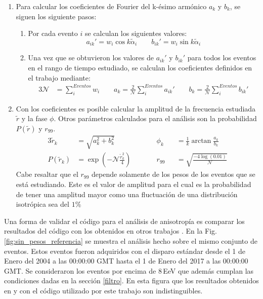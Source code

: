 \begin{enumerate}
        \item Para calcular los coeficientes de Fourier del k-ésimo armónico $a_k$ y $b_k$, se siguen los siguiente pasos:
        \begin{enumerate}
          \item Por cada evento  $i$ se calculan los siguientes valores:
          \begin{equation}
             a_{ik}' = {w_i}\cos k\tilde{\alpha}_i \qquad
             b_{ik}' = {w_i}\sin k\tilde{\alpha}_i
         \end{equation}
         \item Una vez que se obtuvieron los valores de $a_{ik}'$ y $b_{ik}'$ para todos los eventos en el rango de tiempo estudiado, se calculan los coeficientes definidos en el trabajo \cite{analisis_fourier} mediante:
         \begin{alignat}{3}
          \mathcal{N} &= \sum^{Eventos}_i w_i \qquad
            a_k = \frac{2}{\mathcal{N}} \sum^{Eventos}_i a_{ik}' \qquad
            b_k = \frac{2}{\mathcal{N}} \sum^{Eventos}_i b_{ik}'  
         \end{alignat}
        \end{enumerate}
        \item Con los coeficientes es posible calcular la amplitud de la frecuencia estudiada $\tilde{r}$ y la fase $\phi$. Otros parámetros calculados para el análisis son la probabilidad $P(\tilde{r})$  y $r_{99}$. 
        \begin{alignat}{3}
            \tilde{r}_k &= \sqrt{a_k^2 +b_k^2}                       \qquad &&   \phi_k&&= \frac{1}{k}\arctan\frac{a_k}{b_k}\\
          P(\tilde{r}_k)&= \exp(-\mathcal{N}\frac{\tilde{r}_k^2}{4})\qquad &&   r_{99}&&= \sqrt{\frac{-4\log(0.01)}{\mathcal{N}}}
        \end{alignat}
        Cabe resaltar que el $r_{99}$ depende solamente de los pesos de los eventos que se está estudiando. Este es el valor de amplitud para el cual es la probabilidad de tener una amplitud mayor como una fluctuación de una distribución isotrópica sea del $1$\%
      \end{enumerate}

    Una forma de validar el código para el análisis de anisotropía es comparar los resultados del código con los obtenidos en otros trabajos \cite{taborda}. En la Fig.\ref{fig:sin_pesos_referencia} se muestra el análisis hecho sobre el mismo conjunto de eventos. Estos eventos fueron adquiridos con el disparo estándar desde el 1 de Enero del 2004 a las 00:00:00 GMT  hasta el 1 de Enero del 2017 a las 00:00:00 GMT. Se consideraron los eventos por encima de $8\,$EeV que además cumplan las condiciones dadas en la sección \ref{filtro}.  En esta figura que los resultados obtenidos en \cite{taborda} y con el código utilizado por este trabajo son indistinguibles. 

